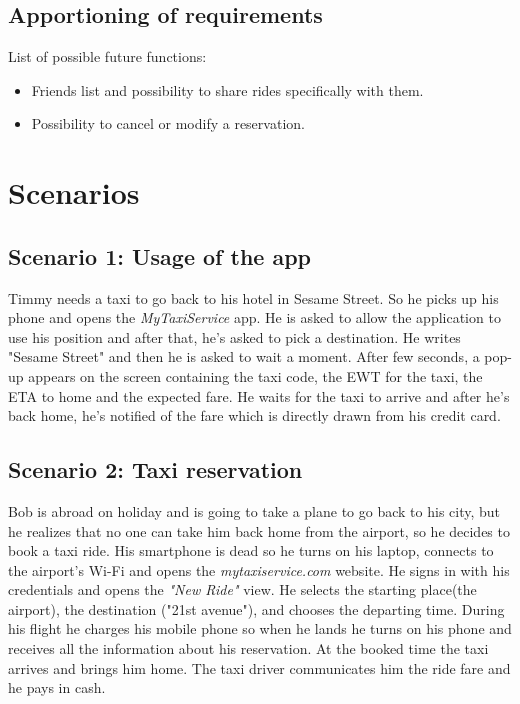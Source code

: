 \documentclass{article}
\begin{document}
\subsection{Apportioning of requirements}
List of possible future functions:
\begin{itemize}
\item Friends list and possibility to share rides specifically with them.
\item Possibility to cancel or modify a reservation.
\end{itemize}

\section{Scenarios}

\subsection{Scenario 1: Usage of the app}
Timmy needs a taxi to go back to his hotel in Sesame Street. So he picks up his phone and opens the \textit{MyTaxiService} app.
He is asked to allow the application to use his position and after that, he's asked to pick a destination. He writes "Sesame Street" and then he is asked to wait a moment.
After few seconds, a pop-up appears on the screen containing the taxi code, the EWT for the taxi, the ETA to home and the expected fare.
He waits for the taxi to arrive and after he's back home, he's notified of the fare which is directly drawn from his credit card.

\subsection{Scenario 2: Taxi reservation}
Bob is abroad on holiday and is going to take a plane to go back to his city, but he realizes that no one can take him back home from the airport, so he decides to book a taxi ride. His smartphone is dead so he turns on his laptop, connects to the airport's Wi-Fi and opens the \textit{mytaxiservice.com} website. He signs in with his credentials and opens the \textit{"New Ride"} view. He selects the starting place(the airport), the destination ("21st avenue"), and chooses the departing time. During his flight he charges his mobile phone so when he lands he turns on his phone and receives all the information about his reservation. At the booked time the taxi arrives and brings him home. The taxi driver communicates him the ride fare and he pays in cash.
\end{document}
